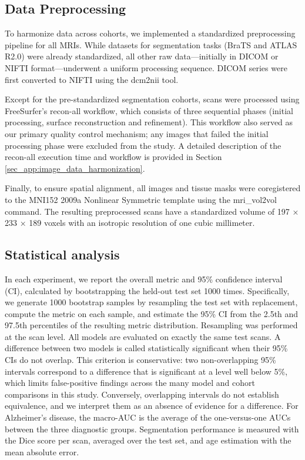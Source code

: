 \documentclass[pdflatex,sn-nature]{sn-jnl}%
\newif\ifhighlight
\newcommand{\rev}[1]{\ifhighlight{\color{blue}{}#1}\else#1\fi}%
\newcommand{\revdel}[1]{\ifhighlight{\color{red}\sout{#1}}\fi}
\theoremstyle{thmstyleone}%
\theoremstyle{thmstyletwo}%
\theoremstyle{thmstylethree}%
\begin{document}
\subsection*{Data Preprocessing}
To harmonize data across cohorts, we implemented a standardized preprocessing pipeline for all MRIs. While datasets for segmentation tasks (BraTS and ATLAS R2.0) were already standardized, all other raw data—initially in DICOM or NIFTI format—underwent a uniform processing sequence. DICOM series were first converted to NIFTI using the dcm2nii tool.

Except for the pre-standardized segmentation cohorts, scans were processed using FreeSurfer’s recon-all workflow, which consists of three sequential phases (initial processing, surface reconstruction and refinement). This workflow also served as our primary quality control mechanism; any images that failed the initial processing phase were excluded from the study. A detailed description of the recon-all execution time and workflow is provided in \revdel{Appendix} Section \ref{sec_app:image_data_harmonization}.

Finally, to ensure spatial alignment, all images and tissue masks were coregistered to the MNI152 2009a Nonlinear Symmetric template using the mri\_vol2vol command. The resulting preprocessed scans have a standardized volume of 197 × 233 × 189 voxels with an isotropic resolution of one cubic millimeter. %

\subsection*{Statistical analysis}
In each experiment, we report the overall metric and 95\% confidence interval (CI), calculated by bootstrapping the held-out test set 1000 times. Specifically, we generate 1000 bootstrap samples by resampling the test set with replacement, compute the metric on each sample, and estimate the 95\% CI from the 2.5th and 97.5th percentiles of the resulting metric distribution. \rev{Resampling was performed at the scan level. All models are evaluated on exactly the same test scans. A difference between two models is called statistically significant when their 95\% CIs do not overlap. This criterion is conservative: two non-overlapping 95\% intervals correspond to a difference that is significant at a level well below 5\%, which limits false-positive findings across the many model and cohort comparisons in this study. Conversely, overlapping intervals do not establish equivalence, and we interpret them as an absence of evidence for a difference. For Alzheimer's disease, the macro-AUC is the average of the one-versus-one AUCs between the three diagnostic groups. Segmentation performance is measured with the Dice score per scan, averaged over the test set, and age estimation with the mean absolute error.}
\end{document}
